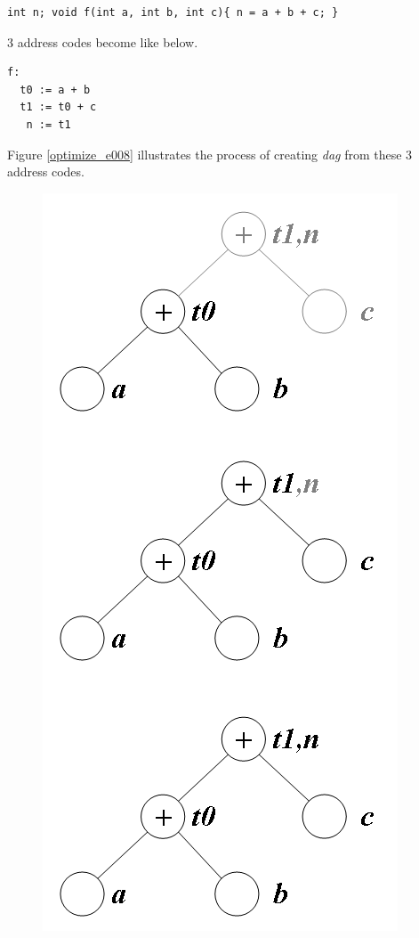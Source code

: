 \begin{Example}
\label{optimize_e007}
\begin{verbatim}
int n; void f(int a, int b, int c){ n = a + b + c; }
\end{verbatim}
3 address codes become like below.
\begin{verbatim}
f:
  t0 := a + b
  t1 := t0 + c
   n := t1
\end{verbatim}
Figure \ref{optimize_e008} illustrates the process of creating
{\em dag} from these 3 address codes.
\begin{figure}[htbp]
\begin{center}
\begin{htmlonly}
\includegraphics[width=0.468\linewidth,height=1.0\linewidth]{opt001.png}
\end{htmlonly}
\begin{latexonly}

\end{latexonly}
\end{center}
\end{figure}
\end{Example}
